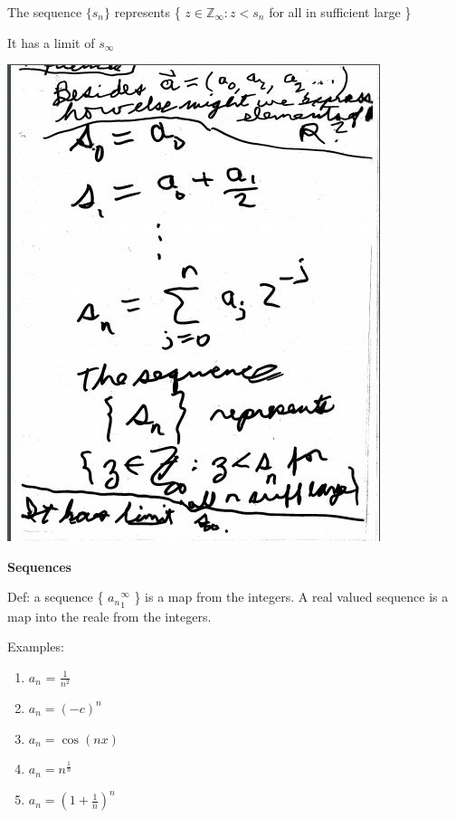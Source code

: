 \documentclass[10pt,a4paper]{article}
\begin{document}
The sequence $\{s_{n}\}$ represents \{ ${z \in \mathbb{Z}_{\infty} : z < s_{n}} $ for all in sufficient large \}

It has a limit of $s_{\infty}$

\includegraphics[scale=.8]{Pages/S&L_page2}

\newpage
{\bf Sequences}


Def: a sequence \{ ${a_n}_{1}^\infty$ \} is a map from the integers. A real valued sequence is a map into the reale from the integers.

Examples:

\begin{enumerate} [{}]

\item $a{_n}$ = $\frac{1}{n^{2}}$
\item $a_{n} = (-c)^{n}$
\item $a_{n} = \cos(nx)$
\item $a_{n} = n^\frac{1}{n}$
\item $a_{n} = (1 + \frac{1}{n})^{n}$

\end{enumerate}
\end{document}
